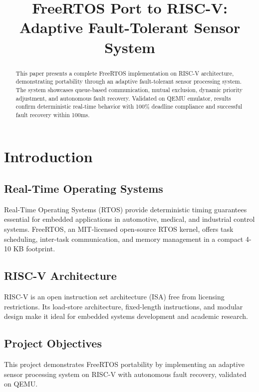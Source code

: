 \documentclass[conference]{IEEEtran}
\begin{document}
\title{FreeRTOS Port to RISC-V: Adaptive Fault-Tolerant Sensor System}

\author{
}

\maketitle

\begin{abstract}
This paper presents a complete FreeRTOS implementation on RISC-V architecture, demonstrating portability through an adaptive fault-tolerant sensor processing system. The system showcases queue-based communication, mutual exclusion, dynamic priority adjustment, and autonomous fault recovery. Validated on QEMU emulator, results confirm deterministic real-time behavior with 100\% deadline compliance and successful fault recovery within 100ms.
\end{abstract}

\section{Introduction}

\subsection{Real-Time Operating Systems}
Real-Time Operating Systems (RTOS) provide deterministic timing guarantees essential for embedded applications in automotive, medical, and industrial control systems. FreeRTOS, an MIT-licensed open-source RTOS kernel, offers task scheduling, inter-task communication, and memory management in a compact 4-10 KB footprint.

\subsection{RISC-V Architecture}
RISC-V is an open instruction set architecture (ISA) free from licensing restrictions. Its load-store architecture, fixed-length instructions, and modular design make it ideal for embedded systems development and academic research.

\subsection{Project Objectives}
This project demonstrates FreeRTOS portability by implementing an adaptive sensor processing system on RISC-V with autonomous fault recovery, validated on QEMU.
\end{document}
